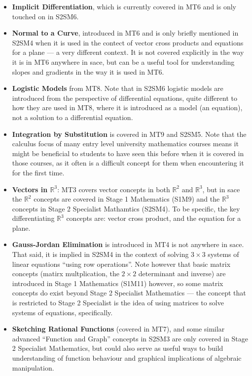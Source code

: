 \documentclass[twoside,12pt,a4paper]{report}
\begin{document}
\begin{itemize}
	\item \textbf{Implicit Differentiation}, which is currently covered in MT6 and is only touched on in S2SM6.
	\item \textbf{Normal to a Curve}, introduced in MT6 and is only briefly mentioned in S2SM4 when it is used in the contect of vector cross products and equations for a plane --- a very different context. It is not covered explicitly in the way it is in MT6 anywhere in \gls{sace}, but can be a useful tool for understanding slopes and gradients in the way it is used in MT6.
	\item \textbf{Logistic Models} from MT8. Note that in S2SM6 logistic models are introduced from the perspective of differential equations, quite different to how they are used in MT8, where it is introduced as a model (an equation), not a solution to a differential equation.
	\item \textbf{Integration by Substitution} is covered in MT9 and S2SM5. Note that the calculus focus of many entry level university mathematics courses means it might be beneficial to students to have seen this before when it is covered in those courses, as it often is a difficult concept for them when encountering it for the first time.
	\item \textbf{Vectors in $\mathbb{R}^3$}: MT3 covers vector concepts in both $\mathbb{R}^2$ and $\mathbb{R}^3$, but in \gls{sace} the $\mathbb{R}^2$ concepts are covered in Stage 1 Mathematics (S1M9) and the $\mathbb{R}^3$ concepts in Stage 2 Specialist Mathamtics (S2SM4). To be specific, the key differentiating $\mathbb{R}^3$ concepts are: vector cross product, and the equation for a plane.
	\item \textbf{Gauss-Jordan Elimination} is introduced in MT4 is not anywhere in \gls{sace}. That said, it is implied in S2SM4 in the context of solving $3 \times 3$ systems of linear equations ``using row operations''. Note however that basic matrix concepts (matirx multplication, the $2\times2$ determinant and inverse) are introduced in Stage 1 Mathematics (S1M11) however, so some matrix concepts do exist beyond Stage 2 Specialist Mathematics --- the concept that is restricted to Stage 2 Specialist is the idea of using matrices to solve systems of equations, specifically. 
	\item \textbf{Sketching Rational Functions} (covered in MT7), and some similar advanced ``Function and Graph'' concepts in S2SM3 are only covered in Stage 2 Specialist Mathematics, but could also serve as useful ways to build understanding of function behaviour and graphical implications of algebraic manipulation.
\end{itemize}
\end{document}
